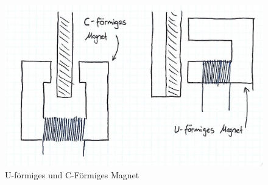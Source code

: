 

\begin{figure}[ht]
    \begin{center}
      \includegraphics[width=12cm]{assets/images/magnet_uc}
    \end{center}
    \vspace{-3ex}
    \caption{U-förmiges und C-Förmiges Magnet}
    \label{fig:magnet_uc}
  \end{figure}